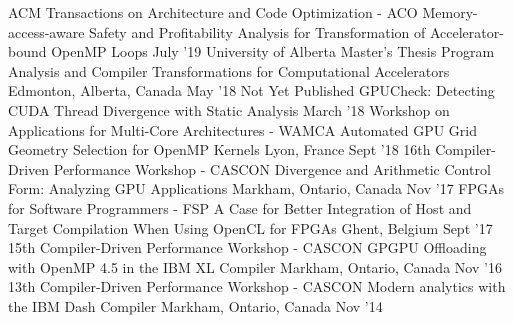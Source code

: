 \begin{cventries}
\publication
  {ACM Transactions on Architecture and Code Optimization - ACO}
  {Memory-access-aware Safety and Profitability Analysis for Transformation of Accelerator-bound OpenMP Loops}
  {}
  {July '19}
\publication
  {University of Alberta Master's Thesis}
  {Program Analysis and Compiler Transformations for Computational Accelerators}
  {Edmonton, Alberta, Canada}
  {May '18}
\publication
  {Not Yet Published}
  {GPUCheck: Detecting CUDA Thread Divergence with Static Analysis}
  {}
  {March '18}
\publication
  {Workshop on Applications for Multi-Core Architectures - WAMCA}
  {Automated GPU Grid Geometry Selection for OpenMP Kernels}
  {Lyon, France}
  {Sept '18}
\presentation
  {16th Compiler-Driven Performance Workshop - CASCON}
  {Divergence and Arithmetic Control Form: Analyzing GPU Applications}
  {Markham, Ontario, Canada}
  {Nov '17}
\publication
  {FPGAs for Software Programmers - FSP}
  {A Case for Better Integration of Host and Target Compilation When Using OpenCL for FPGAs}
  {Ghent, Belgium}
  {Sept '17}
\presentation
  {15th Compiler-Driven Performance Workshop - CASCON}
  {GPGPU Offloading with OpenMP 4.5 in the IBM XL Compiler}
  {Markham, Ontario, Canada}
  {Nov '16}
\presentation
  {13th Compiler-Driven Performance Workshop - CASCON}
  {Modern analytics with the IBM Dash Compiler}
  {Markham, Ontario, Canada}
  {Nov '14}
\end{cventries}
